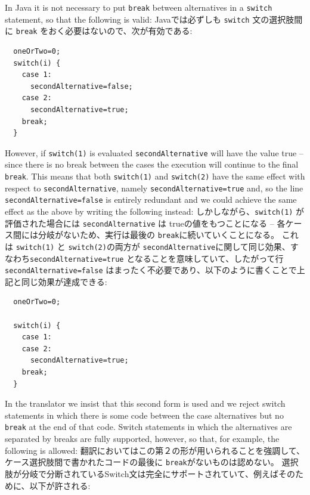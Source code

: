 \documentclass[\pformat,12pt]{jarticle}
\begin{document}
In Java it is not necessary to put \texttt{break} between alternatives
in a \texttt{switch} statement, so that the following is valid:
 Javaでは必ずしも \texttt{switch} 文の選択肢間に \texttt{break} をおく必要はないので、次が有効である:

\begin{small}
\begin{verbatim}
  oneOrTwo=0;
  switch(i) {
    case 1:
      secondAlternative=false;
    case 2:
      secondAlternative=true;
    break;
  }
\end{verbatim}
\end{small}

However, if \texttt{switch(1)} is evaluated \texttt{secondAlternative} will have
the value true -- since
there is no break between the cases the execution will continue to the
final \texttt{break}. This means that both \texttt{switch(1)} and \texttt{switch(2)}
have the same effect with respect to \texttt{secondAlternative}, namely
\texttt{secondAlternative=true} and, so the line
\texttt{secondAlternative=false} is entirely redundant and
we could achieve the same effect
as the above by writing the following instead:
しかしながら、\texttt{switch(1)} が評価された場合には \texttt{secondAlternative} は trueの値をもつことになる -- 各ケース間には分岐がないため、実行は最後の \texttt{break}に続いていくことになる。
これは \texttt{switch(1)} と \texttt{switch(2)}の両方が \texttt{secondAlternative}に関して同じ効果、すなわち\texttt{secondAlternative=true} となることを意味していて、したがって行\texttt{secondAlternative=false} はまったく不必要であり、以下のように書くことで上記と同じ効果が達成できる:

\begin{small}
\begin{verbatim}
  oneOrTwo=0;

  switch(i) {
    case 1:
    case 2:
      secondAlternative=true;
    break;
  }
\end{verbatim}
\end{small}

In the translator we insist that this second form is used and we
reject switch statements in which there is some code between the case
alternatives but no \texttt{break} at the end of that code. Switch
statements in which the alternatives are separated by breaks are fully
supported, however, so that, for example, the following is allowed:
翻訳においてはこの第２の形が用いられることを強調して、 ケース選択肢間で書かれたコードの最後に \texttt{break}がないものは認めない。 
選択肢が分岐で分断されているSwitch文は完全にサポートされていて、例えばそのために、以下が許される:
\end{document}
